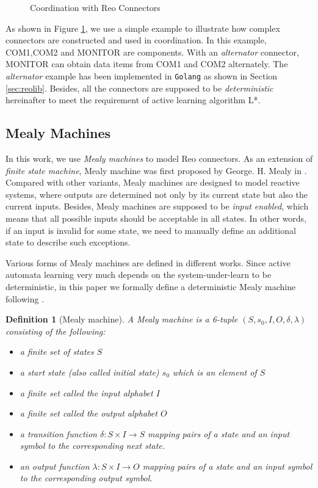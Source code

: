 \documentclass[conference, a4paper]{IEEEtran}
\newtheorem{definition}{Definition}
\begin{document}
\begin{figure}[ht]
  \begin{center}
    
  \end{center}
  \caption{Coordination with Reo Connectors}
  \label{fig:reoconnector}
\end{figure}

As shown in Figure \ref{fig:reoconnector}, we use a simple example to illustrate how complex
connectors are constructed and used in coordination. In this example, COM1,COM2 and
MONITOR are components. With an \emph{alternator} connector, MONITOR can obtain data items from
COM1 and COM2 alternately. The \emph{alternator} example has been implemented in \texttt{Golang} as
shown in Section \ref{sec:reolib}.
Besides, all the connectors are supposed to be \emph{deterministic} hereinafter to meet the
requirement of active learning algorithm L*.


\subsection{Mealy Machines}

In this work, we use \emph{Mealy machines} to model Reo connectors.
As an extension of \emph{finite state machine}, Mealy machine was first proposed by George. H. Mealy
in \cite{George1955A}. Compared with other variants, Mealy machines are designed to model
reactive systems, where outputs are determined not only by its current state but also the current
inputs. Besides, Mealy machines are supposed to be \emph{input enabled}, which means that all
possible inputs should be acceptable in all states. In other words, if an input is invalid for some
state, we need to manually define an additional state to describe such exceptions.

Various forms of Mealy machines are defined in different works. 
Since active automata learning very much depends on the system-under-learn to be deterministic, in
this paper we formally define a deterministic Mealy machine following
\cite{DBLP:conf/sfm/SteffenHM11}. 

\begin{definition}[Mealy machine]
  A Mealy machine is a 6-tuple $(S, s_0, I, O, \delta, \lambda)$ consisting of the following:
  \begin{itemize}
    \item[-] a finite set of states $S$
    \item[-] a start state (also called initial state) $s_0$ which is an element of $S$
    \item[-] a finite set called the input alphabet $I$
    \item[-] a finite set called the output alphabet $O$
    \item[-] a transition function $\delta : S \times I \rightarrow S$ mapping pairs of a
      state and an input symbol to the corresponding next state.
    \item[-] an output function $\lambda : S \times I \rightarrow O$ mapping pairs
      of a state and an input symbol to the corresponding output symbol.
  \end{itemize}
\end{definition}
\end{document}
